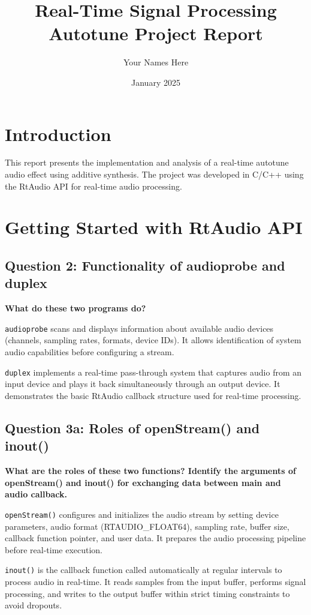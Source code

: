 \documentclass[11pt,a4paper]{article}
\title{Real-Time Signal Processing \\
\large Autotune Project Report}
\author{Your Names Here}
\date{January 2025}
\begin{document}
\maketitle

\section{Introduction}

This report presents the implementation and analysis of a real-time autotune audio effect using additive synthesis. The project was developed in C/C++ using the RtAudio API for real-time audio processing.

\section{Getting Started with RtAudio API}

\subsection{Question 2: Functionality of audioprobe and duplex}

\textbf{What do these two programs do?}

\texttt{audioprobe} scans and displays information about available audio devices (channels, sampling rates, formats, device IDs). It allows identification of system audio capabilities before configuring a stream.

\texttt{duplex} implements a real-time pass-through system that captures audio from an input device and plays it back simultaneously through an output device. It demonstrates the basic RtAudio callback structure used for real-time processing.

\subsection{Question 3a: Roles of openStream() and inout()}

\textbf{What are the roles of these two functions? Identify the arguments of openStream() and inout() for exchanging data between main and audio callback.}

\texttt{openStream()} configures and initializes the audio stream by setting device parameters, audio format (RTAUDIO\_FLOAT64), sampling rate, buffer size, callback function pointer, and user data. It prepares the audio processing pipeline before real-time execution.

\texttt{inout()} is the callback function called automatically at regular intervals to process audio in real-time. It reads samples from the input buffer, performs signal processing, and writes to the output buffer within strict timing constraints to avoid dropouts.
\end{document}
